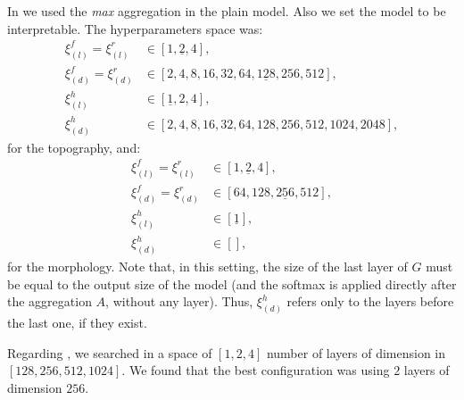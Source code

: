 In \maxi{} we used the \emph{max} aggregation in the plain
model. Also we set the model to be interpretable. The hyperparameters
space was: 
\begin{align*}
  \xi_{(l)}^f=\xi_{(l)}^r&\in[1,\underline{2},4],\\
  \xi_{(d)}^f=\xi_{(d)}^r&\in[2,4,8,16,32,64,\underline{128},256,512],\\
  \xi_{(l)}^h&\in[\underline{1},2,4],\\
  \xi_{(d)}^h&\in[2,4,8,16,32,64,128,256,512,1024,2048],
\end{align*}
for the topography, and:
\begin{align*}
  \xi_{(l)}^f=\xi_{(l)}^r&\in[1,\underline{2},4],\\
  \xi_{(d)}^f=\xi_{(d)}^r&\in[64,128,\underline{256},512],\\
  \xi_{(l)}^h&\in[\underline{1}],\\
  \xi_{(d)}^h&\in[],
\end{align*}
for the morphology. Note that, in this setting, the size of the
last layer of $G$ must be equal to the output size of the model
(and the softmax is applied directly after the aggregation $A$,
without any layer). Thus, $\xi_{(d)}^h$ refers only to the
layers before the last one, if they exist.

Regarding \gru{}, we searched in a space of $[1,2,4]$ number of layers of
dimension in $[128,256,512,1024]$. We found that the best
configuration was using $2$ layers of dimension $256$.




